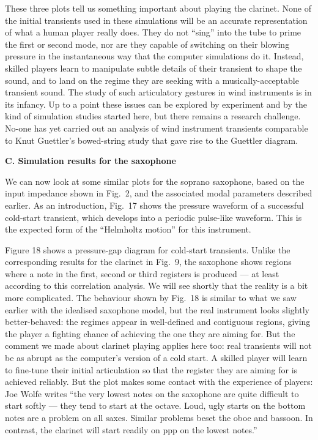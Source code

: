   These three plots tell us something important about playing the clarinet. 
  None of the initial transients used in these simulations will be an accurate 
  representation of what a human player really does. They do not “sing” into 
  the tube to prime the first or second mode, nor are they capable of switching 
  on their blowing pressure in the instantaneous way that the computer 
  simulations do it. Instead, skilled players learn to manipulate subtle 
  details of their transient to shape the sound, and to land on the regime they 
  are seeking with a musically-acceptable transient sound. The study of such 
  articulatory gestures in wind instruments is in its infancy. Up to a point 
  these issues can be explored by experiment and by the kind of simulation 
  studies started here, but there remains a research challenge. No-one has yet 
  carried out an analysis of wind instrument transients comparable to Knut 
  Guettler’s bowed-string study that gave rise to the Guettler diagram. 

  \textbf{C. Simulation results for the saxophone} 

  We can now look at some similar plots for the soprano saxophone, based on the 
  input impedance shown in Fig.\ 2, and the associated modal parameters 
  described earlier. As an introduction, Fig.\ 17 shows the pressure waveform 
  of a successful cold-start transient, which develops into a periodic 
  pulse-like waveform. This is the expected form of the “Helmholtz motion” for 
  this instrument. 


  Figure 18 shows a pressure-gap diagram for cold-start transients. Unlike the 
  corresponding results for the clarinet in Fig.\ 9, the saxophone shows 
  regions where a note in the first, second or third registers is produced — at 
  least according to this correlation analysis. We will see shortly that the 
  reality is a bit more complicated. The behaviour shown by Fig.\ 18 is similar 
  to what we saw earlier with the idealised saxophone model, but the real 
  instrument looks slightly better-behaved: the regimes appear in well-defined 
  and contiguous regions, giving the player a fighting chance of achieving the 
  one they are aiming for. But the comment we made about clarinet playing 
  applies here too: real transients will not be as abrupt as the computer’s 
  version of a cold start. A skilled player will learn to fine-tune their 
  initial articulation so that the register they are aiming for is achieved 
  reliably. But the plot makes some contact with the experience of players: Joe 
  Wolfe writes ``the very lowest notes on the saxophone are quite difficult to 
  start softly --- they tend to start at the octave. Loud, ugly starts on the 
  bottom notes are a problem on all saxes. Similar problems beset the oboe and 
  bassoon. In contrast, the clarinet will start readily on ppp on the lowest 
  notes.'' 

